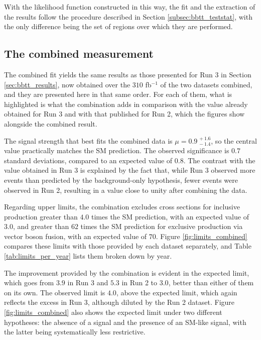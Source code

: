 With the likelihood function constructed in this way, the fit and the extraction of the results follow the procedure described in Section \ref{subsec:bbtt_teststat}, with the only difference being the set of regions over which they are performed.


\subsection{The combined measurement}
\label{subsec:bbtt_comb_results}
%
The combined fit yields the same results as those presented for Run 3 in Section \ref{sec:bbtt_results}, now obtained over the $310$ fb$^{-1}$ of the two datasets combined, and they are presented here in that same order. For each of them, what is highlighted is what the combination adds in comparison with the value already obtained for Run 3 and with that published for Run 2, which the figures show alongside the combined result.

The signal strength that best fits the combined data is $\mu = 0.9^{\,+1.6}_{\,-1.4}$, so the central value practically matches the SM prediction. The observed significance is $0.7$ standard deviations, compared to an expected value of $0.8$. The contrast with the value obtained in Run 3 is explained by the fact that, while Run 3 observed more events than predicted by the background-only hypothesis, fewer events were observed in Run 2, resulting in a value close to unity after combining the data.

Regarding upper limits, the combination excludes cross sections for inclusive production greater than $4.0$ times the SM prediction, with an expected value of $3.0$, and greater than $62$ times the SM prediction for exclusive production via vector boson fusion, with an expected value of $70$. Figure \ref{fig:limits_combined} compares these limits with those provided by each dataset separately, and Table \ref{tab:limits_per_year} lists them broken down by year.

The improvement provided by the combination is evident in the expected limit, which goes from $3.9$ in Run 3 and $5.3$ in Run 2 to $3.0$, better than either of them on its own. The observed limit is $4.0$, above the expected limit, which again reflects the excess in Run 3, although diluted by the Run 2 dataset. Figure \ref{fig:limits_combined} also shows the expected limit under two different hypotheses: the absence of a signal and the presence of an SM-like signal, with the latter being systematically less restrictive.

